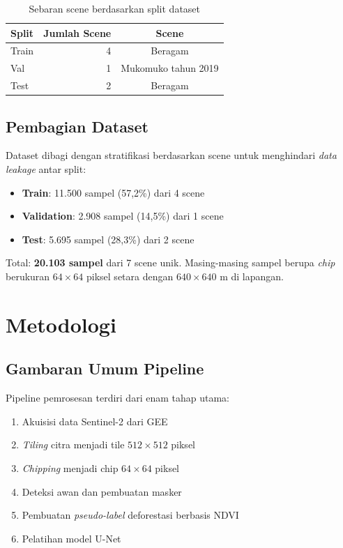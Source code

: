 \documentclass[12pt,a4paper]{article}
\begin{document}
\begin{table}[H]
\centering
\caption{Sebaran scene berdasarkan split dataset}
\label{tab:scenes}
\begin{tabular}{lrc}
\toprule
\textbf{Split} & \textbf{Jumlah Scene} & \textbf{Scene} \\
\midrule
Train & 4 & Beragam \\
Val   & 1 & Mukomuko tahun 2019 \\
Test  & 2 & Beragam \\
\bottomrule
\end{tabular}
\end{table}

\subsection{Pembagian Dataset}

Dataset dibagi dengan stratifikasi berdasarkan scene untuk menghindari 
\textit{data leakage} antar split:

\begin{itemize}[nosep]
    \item \textbf{Train}: 11.500 sampel (57,2\%) dari 4 scene
    \item \textbf{Validation}: 2.908 sampel (14,5\%) dari 1 scene
    \item \textbf{Test}: 5.695 sampel (28,3\%) dari 2 scene
\end{itemize}

Total: \textbf{20.103 sampel} dari 7 scene unik. Masing-masing sampel berupa 
\textit{chip} berukuran $64 \times 64$ piksel setara dengan $640 \times 640$ m 
di lapangan.

\section{Metodologi}
\label{sec:metodologi}

\subsection{Gambaran Umum Pipeline}

Pipeline pemrosesan terdiri dari enam tahap utama:

\begin{enumerate}[nosep]
    \item Akuisisi data Sentinel-2 dari GEE
    \item \textit{Tiling} citra menjadi tile $512 \times 512$ piksel
    \item \textit{Chipping} menjadi chip $64 \times 64$ piksel
    \item Deteksi awan dan pembuatan masker
    \item Pembuatan \textit{pseudo-label} deforestasi berbasis NDVI
    \item Pelatihan model U-Net
\end{enumerate}
\end{document}
